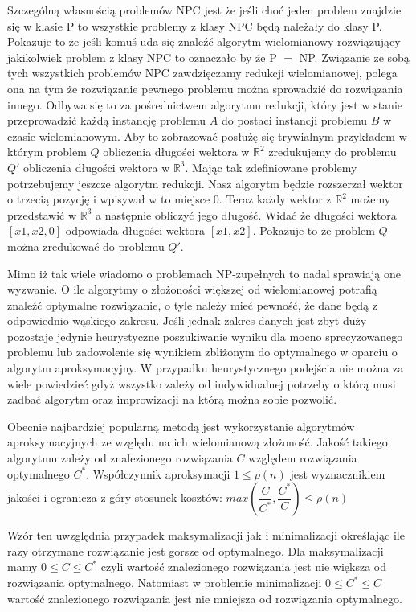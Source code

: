 Szczególną własnością problemów NPC jest że jeśli choć jeden problem znajdzie się w klasie P to wszystkie problemy z klasy NPC będą należały do klasy P. Pokazuje to że jeśli komuś uda się znaleźć algorytm wielomianowy rozwiązujący jakikolwiek problem z klasy NPC to oznaczało by że P $=$ NP. Związanie ze sobą tych wszystkich problemów NPC zawdzięczamy redukcji wielomianowej, polega ona na tym że rozwiązanie pewnego problemu można sprowadzić do rozwiązania innego. Odbywa się to za pośrednictwem algorytmu redukcji, który jest w stanie przeprowadzić każdą instancję problemu $A$ do postaci instancji problemu $B$ w czasie wielomianowym. Aby to zobrazować posłużę się trywialnym przykładem w którym problem $Q$ obliczenia długości wektora w $\mathbb{R}^{2}$ zredukujemy do problemu $Q'$ obliczenia długości wektora w $\mathbb{R}^{3}$. Mając tak zdefiniowane problemy potrzebujemy jeszcze algorytm redukcji. Nasz algorytm będzie rozszerzał wektor o trzecią pozycję i wpisywał w to miejsce $0$. Teraz każdy wektor z $\mathbb{R}^{2}$ możemy przedstawić w $\mathbb{R}^{3}$ a następnie obliczyć jego długość. Widać że długości wektora $[x1,x2,0]$ odpowiada długości wektora $[x1,x2]$. Pokazuje to że problem $Q$ można zredukować do problemu $Q'$.

Mimo iż tak wiele wiadomo o problemach NP-zupełnych to nadal sprawiają one wyzwanie. O ile algorytmy o złożoności większej od wielomianowej potrafią znaleźć optymalne rozwiązanie, o tyle należy mieć pewność, że dane będą z odpowiednio wąskiego zakresu. Jeśli jednak zakres danych jest zbyt duży pozostaje jedynie heurystyczne poszukiwanie wyniku dla mocno sprecyzowanego problemu lub zadowolenie się wynikiem zbliżonym do optymalnego w oparciu o algorytm aproksymacyjny. W przypadku heurystycznego podejścia nie można za wiele powiedzieć gdyż wszystko zależy od indywidualnej potrzeby o którą musi zadbać algorytm  oraz improwizacji na którą można sobie pozwolić.

Obecnie najbardziej popularną metodą jest wykorzystanie algorytmów aproksymacyjnych ze względu na ich wielomianową złożoność. Jakość takiego algorytmu zależy od znalezionego rozwiązania $C$ względem rozwiązania optymalnego $C^{*}$. Współczynnik aproksymacji $1 \leq \rho(n)$ jest wyznacznikiem jakości i ogranicza z góry stosunek kosztów: $max(\dfrac{C}{C^{*}},\dfrac{C^{*}}{C}) \leq \rho(n)$

Wzór ten uwzględnia przypadek maksymalizacji jak i minimalizacji określając ile razy otrzymane rozwiązanie jest gorsze od optymalnego. Dla maksymalizacji mamy $0 \leq C \leq C^{*}$ czyli wartość znalezionego rozwiązania jest nie większa od rozwiązania optymalnego. Natomiast w problemie minimalizacji $0 \leq C^{*} \leq C$ wartość znalezionego rozwiązania jest nie mniejsza od rozwiązania optymalnego.
